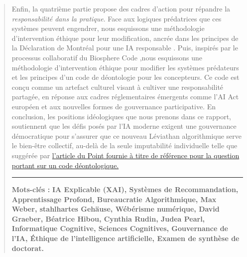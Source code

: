 \begin{quote}
Enfin, la quatrième partie propose des cadres d'action pour répandre la \textit{responsabilité dans la pratique}. Face aux logiques prédatrices que ces systèmes peuvent engendrer, nous esquissons une méthodologie d'intervention éthique pour leur modification, ancrée dans les principes de la Déclaration de Montréal pour une IA responsable \citep{Université2024Dclaration}. Puis, inspirés par le processus collaboratif du Biosphere Code \citep{BiosphereCode2015},nous esquissons une méthodologie d'intervention éthique pour modifier les systèmes prédateurs et les principes d'un code de déontologie pour les concepteurs. Ce code est conçu comme un artefact culturel visant à cultiver une responsabilité partagée, en réponse aux cadres réglementaires émergents comme l'AI Act européen et aux nouvelles formes de gouvernance participative. En conclusion, les positions idéologiques que nous prenons dans ce rapport, soutiennent que les défis posés par l'IA moderne exigent une gouvernance démocratique pour s'assurer que ce nouveau Léviathan algorithmique serve le bien-être collectif, au-delà de la seule imputabilité individuelle telle que suggérée par \hyperref[annexe:question2]{l'article du Point fournie à titre de référence pour la question portant sur un code déontologique.}\citep{Neuer2019Algorithmes} \\
\vspace{0.1em}
\hrule
\noindent
{\footnotesize \textbf{Mots-clés :} {\small \textbf{ IA Explicable (XAI), Systèmes de Recommandation, Apprentissage Profond, Bureaucratie Algorithmique, Max Weber, stahlhartes Gehäuse, Wébérisme numérique, David Graeber, Béatrice Hibou, Cynthia Rudin, Judea Pearl, Informatique Cognitive, Sciences Cognitives, Gouvernance de l'IA, Éthique de l'intelligence artificielle, Examen de synthèse de doctorat.}}}

\end{quote}
